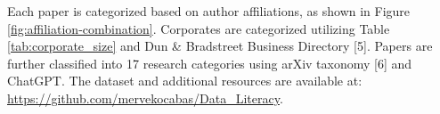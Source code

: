 \documentclass{article}
\begin{document}
Each paper is categorized based on author affiliations, as shown in Figure \ref{fig:affiliation-combination}. Corporates are categorized utilizing Table \ref{tab:corporate_size} and Dun \& Bradstreet Business Directory [5]. Papers are further classified into 17 research categories using arXiv taxonomy [6] and ChatGPT. The dataset and additional resources are available at: \url{https://github.com/mervekocabas/Data_Literacy}.


\end{document}
